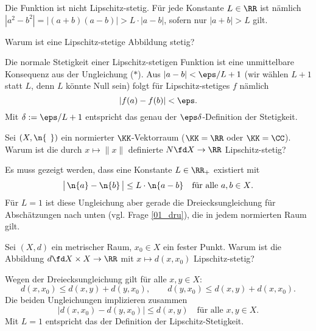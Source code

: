\begin{antwort}
  Die Funktion ist nicht Lipschitz-stetig. 
  Für jede Konstante $L\in\RR$ ist nämlich 
  $
  \left| a^2-b^2 \right| = \big| (a+b)(a-b) \big| > L \cdot |a-b|$, 
  sofern nur $|a+b|>L$ gilt. \AntEnd
\end{antwort}

\begin{frage}
  Warum ist eine Lipschitz-stetige Abbildung stetig? 
\end{frage} 

\begin{antwort}
  Die normale Stetigkeit einer Lipschitz-stetigen Funktion ist eine  
  unmittelbare Konsequenz aus der Ungleichung ($\ast$). 
  Aus $|a-b|<\eps/L+1$ (wir wählen $L+1$ statt $L$, denn $L$ könnte Null sein) folgt für Lipschitz-stetiges $f$ nämlich  
  \[
  |f(a)-f(b)| < \eps.
  \]
  Mit $\delta:=\eps/L+1$ entspricht das genau der 
  $\eps\delta$-Definition der Stetigkeit.
  \AntEnd
\end{antwort}

\begin{frage}\label{03_lipn}
  Sei $(X, \n{ \,\; })$ ein normierter $\KK$-Vektorraum 
  ($\KK=\RR$ oder $\KK=\CC$). Warum ist die durch 
  $x\mapsto \| x \|$ definierte  
  $N \fd X\to \RR$ Lipschitz-stetig?
\end{frage}

\begin{antwort}
  Es muss gezeigt werden, dass eine Konstante $L\in\RR_+$ existiert mit 
  \[
  \big|\, \n{a} - \n{b} \, \big| 
  \le L  \cdot \n{ a-b }  \quad\text{für alle $a,b\in X$}.
  \]
  Für $L=1$ ist diese Ungleichung aber gerade die Dreiecksungleichung 
  für Abschätzungen nach unten (vgl. Frage \ref{01_dru}), 
  die in jedem normierten Raum gilt. 
  \AntEnd
\end{antwort}

\begin{frage}\label{03_lipd}
  Sei $(X,d)$ ein metrischer Raum, $x_0\in X$ ein fester Punkt. 
  Warum ist die Abbildung $d \fd X\times X \to \RR$ mit  
  $x\mapsto d(x,x_0)$ Lipschitz-stetig?
\end{frage}

\begin{antwort}
  Wegen der Dreiecksungleichung gilt für alle $x,y\in X$:
  \[
  d(x,x_0) \le d(x,y) + d(y,x_0), \qquad 
  d(y,x_0) \le d(x,y) + d(x,x_0).
  \]
  Die beiden Ungleichungen implizieren zusammen 
  \[
  \big| d(x,x_0) -d(y,x_0) \big| \le 
  d( x,y ) \quad\text{für alle $x,y\in X$}.
  \]
  Mit $L=1$ entspricht das der Definition der Lipschitz-Stetigkeit.
  \AntEnd
\end{antwort}

